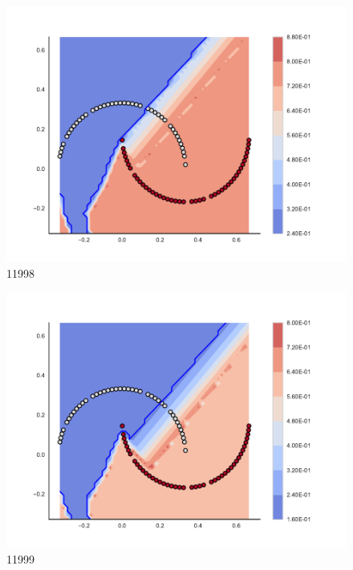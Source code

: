 \begin{subfigure}[b]{0.09\textwidth}
    \includegraphics[clip, trim=2.35cm 1.75cm 4.5cm 0cm,width=\textwidth]{img/convergence/11998.pdf}
    \caption{11998}
    \label{fig:convergence_11998}
\end{subfigure}
%
\begin{subfigure}[b]{0.09\textwidth}
    \includegraphics[clip, trim=2.35cm 1.75cm 4.5cm 0cm,width=\textwidth]{img/convergence/11999.pdf}
    \caption{11999}
    \label{fig:convergence_11999}
\end{subfigure}
%
